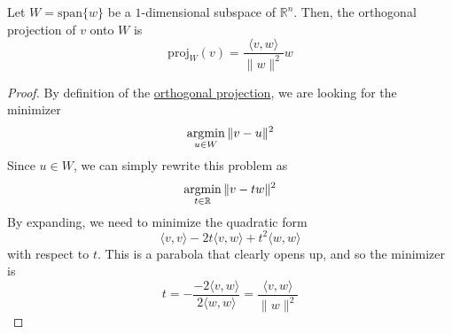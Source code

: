 	\begin{lemma}
	  \label{thm:orthogonal-projection-formula-onto-1-dimension}
		Let $W = \mathrm{span}\{w\}$ be a $1$-dimensional subspace of $\mathbb{R}^n$. Then, the orthogonal projection of $v$ onto $W$ is 
		\begin{equation}
			\mathrm{proj}_W (v) = \frac{\langle v, w \rangle}{\|w\|^2} w
		\end{equation}
	\end{lemma}
	\begin{proof}
		By definition of the \hyperref[def:orthogonal-projection]{orthogonal projection}, we are looking for the minimizer 
		\begin{equation}
			\operatorname*{argmin}_{u \in W} \|v - u\|^2 
		\end{equation}
		Since $u \in W$, we can simply rewrite this problem as 
		\begin{equation}
			\operatorname*{argmin}_{t \in \mathbb{R}} \|v - tw\|^2 
		\end{equation}
		By expanding, we need to minimize the quadratic form 
		\begin{equation}
		  \langle v, v \rangle - 2 t \langle v, w \rangle + t^2 \langle w, w \rangle
		\end{equation} 
		with respect to $t$. This is a parabola that clearly opens up, and so the minimizer is 
		\begin{equation}
			t = - \frac{-2 \langle v, w \rangle}{2 \langle w, w \rangle} = \frac{\langle v, w \rangle}{\|w\|^2}
		\end{equation}
	\end{proof}

